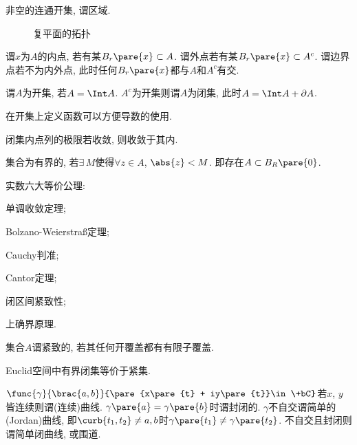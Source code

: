 \documentclass[../ComplexVariable.tex]{subfiles}
\begin{document}
\begin{definition}[区域]
    非空的连通开集, 谓区域.
\end{definition}
\begin{figure}[ht]
    \centering
    \caption{复平面的拓扑}
\end{figure}
谓$x$为$A$的内点, 若有某$B_r\pare{x}\subset A$. 谓外点若有某$B_r\pare{x}\subset A^c$. 谓边界点若不为内外点, 此时任何$B_r\pare{x}$都与$A$和$A^c$有交.
\begin{definition}[开集]
    谓$A$为开集, 若$A = \Int A$. $A^c$为开集则谓$A$为闭集, 此时$A = \Int A + \partial A$.
\end{definition}
\begin{remark}
    在开集上定义函数可以方便导数的使用.
\end{remark}
\begin{remark}
    闭集内点列的极限若收敛, 则收敛于其内.
\end{remark}
\begin{definition}[有界]
    集合为有界的, 若$\exists\, M$使得$\forall z\in A$, $\abs{z} < M$. 即存在$A\subset B_R\pare{0}$.
\end{definition}
实数六大等价公理:
\begin{multicols}{2}
    \begin{cenum}
        \item 单调收敛定理;
        \item Bolzano-Weierstra\ss 定理;
        \item Cauchy判准;
        \item Cantor定理;
        \item 闭区间紧致性;
        \item 上确界原理.
    \end{cenum}
\end{multicols}
\begin{definition}[紧致性]
    集合$A$谓紧致的, 若其任何开覆盖都有有限子覆盖.
\end{definition}
\begin{theorem}
    Euclid空间中有界闭集等价于紧集.
\end{theorem}
\begin{definition}[曲线]
    $\func{\gamma}{\brac{a,b}}{\pare{x\pare{t} + iy\pare{t}}\in \+bC}$若$x$, $y$皆连续则谓(连续)曲线. $\gamma\pare{a} = \gamma\pare{b}$时谓封闭的. $\gamma$不自交谓简单的(Jordan)曲线, 即$\curb{t_1, t_2}\neq {a,b}$时$\gamma\pare{t_1}\neq \gamma\pare{t_2}$. 不自交且封闭则谓简单闭曲线, 或围道.
\end{definition}
\end{document}
